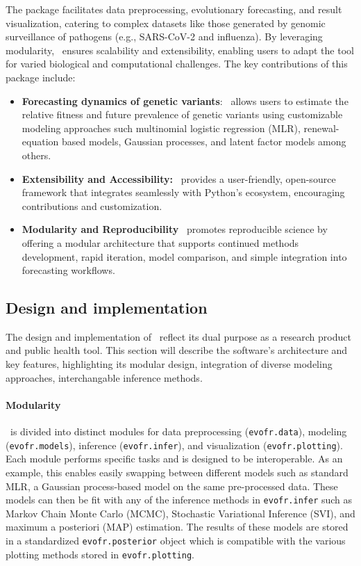 The package facilitates data preprocessing, evolutionary forecasting, and result visualization, catering to complex datasets like those generated by genomic surveillance of pathogens (e.g., SARS-CoV-2 and influenza). 
By leveraging modularity, \evofr\ ensures scalability and extensibility, enabling users to adapt the tool for varied biological and computational challenges. 
The key contributions of this package include:
\begin{itemize}
	\item \textbf{Forecasting dynamics of genetic variants}: \evofr\ allows users to estimate the relative fitness and future prevalence of genetic variants using customizable modeling approaches such multinomial logistic regression (MLR), renewal-equation based models, Gaussian processes, and latent factor models among others.
	\item \textbf{Extensibility and Accessibility:} \evofr\ provides a user-friendly, open-source framework that integrates seamlessly with Python’s ecosystem, encouraging contributions and customization.
	\item \textbf{Modularity and Reproducibility} \evofr\ promotes reproducible science by offering a modular architecture that supports continued methods development, rapid iteration, model comparison, and simple integration into forecasting workflows.
\end{itemize}

\subsection{Design and implementation}

The design and implementation of \evofr\ reflect its dual purpose as a research product and public health tool.
This section will describe the software's architecture and key features, highlighting its modular design, integration of diverse modeling approaches, interchangable inference methods.

\paragraph{Modularity}

\evofr\ is divided into distinct modules for data preprocessing (\texttt{evofr.data}), modeling (\texttt{evofr.models}), inference (\texttt{evofr.infer}), and visualization (\texttt{evofr.plotting}).
Each module performs specific tasks and is designed to be interoperable.
As an example, this enables easily swapping between different models such as standard MLR, a Gaussian process-based model on the same pre-processed data.
These models can then be fit with any of the inference methods in \texttt{evofr.infer} such as Markov Chain Monte Carlo (MCMC), Stochastic Variational Inference (SVI), and maximum a posteriori (MAP) estimation.
The results of these models are stored in a standardized \texttt{evofr.posterior} object which is compatible with the various plotting methods stored in \texttt{evofr.plotting}.

